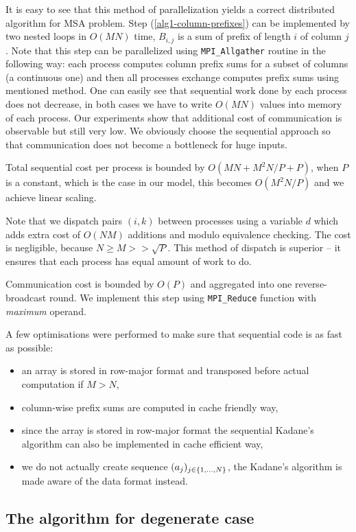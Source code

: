 It is easy to see that this method of parallelization yields a correct distributed algorithm for MSA problem.
Step (\ref{alg1-column-prefixes}) can be implemented by two nested loops in $O(MN)$ time, $B_{i, j}$ is a sum of prefix of length $i$ of column $j$.
Note that this step can be parallelized using \verb+MPI_Allgather+ routine in the following way: each process computes column prefix sums for a subset of columns (a continuous one) and then all processes exchange computes prefix sums using mentioned method.
One can easily see that sequential work done by each process does not decrease, in both cases we have to write $O(MN)$ values into memory of each process.
Our experiments show that additional cost of communication is observable but still very low.
We obviously choose the sequential approach so that communication does not become a bottleneck for huge inputs.

Total sequential cost per process is bounded by $O(MN + M^2N / P + P)$, when $P$ is a constant, which is the case in our model, this becomes $O(M^2N / P)$ and we achieve linear scaling.

Note that we dispatch pairs $(i, k)$ between processes using a variable $d$ which adds extra cost of $O(NM)$ additions and modulo equivalence checking.
The cost is negligible, because $N \geq M >> \sqrt{P}$.
This method of dispatch is superior -- it ensures that each process has equal amount of work to do.

Communication cost is bounded by $O(P)$ and aggregated into one reverse-broadcast round.
We implement this step using \verb+MPI_Reduce+ function with \emph{maximum} operand.

A few optimisations were performed to make sure that sequential code is as fast as possible:
\begin{itemize}
    \item an array is stored in row-major format and transposed before actual computation if $M > N$,
    \item column-wise prefix sums are computed in cache friendly way,
    \item since the array is stored in row-major format the sequential Kadane's algorithm can also be implemented in cache efficient way,
    \item we do not actually create sequence $(a_j)_{j \in \{ 1, \dots, N \}}$, the Kadane's algorithm is made aware of the data format instead.
\end{itemize}

\subsection*{The algorithm for degenerate case}

